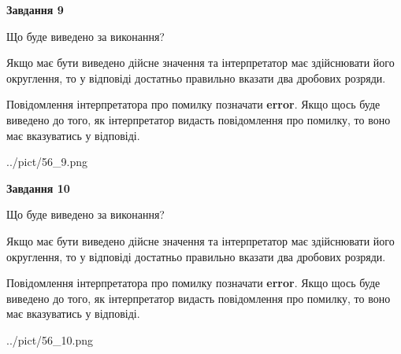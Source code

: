 \documentclass[12pt, ukrainian]{article}
\begin{document}
{\begin {Large}
{\begin {center}\textbf{Завдання 9}\end {center}}\par
Що буде виведено за виконання? \par

Якщо має бути виведено дійсне значення та інтерпретатор має здійснювати його округлення, 
то у відповіді достатньо правильно вказати два дробових розряди.

Повідомлення інтерпретатора про помилку позначати \textbf{error}.
Якщо щось буде виведено до того, як інтерпретатор видасть повідомлення про помилку, 
то воно має вказуватись у відповіді. \par

\begin{center}
	{../pict/56_9.png}
\end{center}
\newpage

{\begin {center}\textbf{Завдання 10}\end {center}}\par
Що буде виведено за виконання? \par

Якщо має бути виведено дійсне значення та інтерпретатор має здійснювати його округлення, 
то у відповіді достатньо правильно вказати два дробових розряди.

Повідомлення інтерпретатора про помилку позначати \textbf{error}.
Якщо щось буде виведено до того, як інтерпретатор видасть повідомлення про помилку, 
то воно має вказуватись у відповіді. \par

\begin{center}
	{../pict/56_10.png}
\end{center}
\newpage

\end {Large}}
\end{document}
